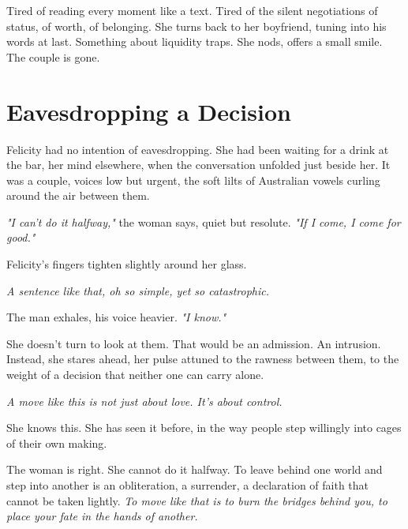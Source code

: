 \smallskip

Tired of reading every moment like a text. Tired of the silent negotiations of status, of worth, of belonging. She turns back to her boyfriend, tuning into his words at last. Something about liquidity traps.  She nods, offers a small smile. The couple is gone.

\section*{Eavesdropping a Decision}

Felicity had no intention of eavesdropping.  She had been waiting for a drink at the bar, her mind elsewhere, when the conversation unfolded just beside her. It was a couple, voices low but urgent, the soft lilts of Australian vowels curling around the air between them.

\smallskip

\textit{"I can't do it halfway,"} the woman says, quiet but resolute. \textit{"If I come, I come for good."}

\smallskip

Felicity’s fingers tighten slightly around her glass.  

\smallskip

\textit{A sentence like that, oh so simple, yet so catastrophic.}

\smallskip

The man exhales, his voice heavier. \textit{"I know."}  

\smallskip

She doesn’t turn to look at them. That would be an admission. An intrusion. Instead, she stares ahead, her pulse attuned to the rawness between them, to the weight of a decision that neither one can carry alone.

\smallskip

\textit{A move like this is not just about love. It’s about control.}

\smallskip

She knows this. She has seen it before, in the way people step willingly into cages of their own making. 

\smallskip

The woman is right. She cannot do it halfway.  
To leave behind one world and step into another is an obliteration, a surrender, a declaration of faith that cannot be taken lightly.  
\textit{To move like that is to burn the bridges behind you, to place your fate in the hands of another.}

